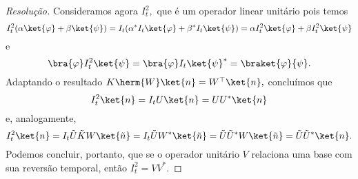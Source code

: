 \begin{proof}[Resolução]
    Consideramos agora \(I_t^2,\) que é um operador linear unitário pois temos
    \begin{equation*}
        I_t^2(\alpha \ket{\varphi} + \beta \ket{\psi}) = I_t (\alpha^* I_t\ket{\varphi} + \beta^* I_t \ket{\psi}) = \alpha I_t^2 \ket{\varphi} + \beta I_t^2 \ket{\psi}
    \end{equation*}
    e
    \begin{equation*}
        \bra{\varphi}I_t^2\ket{\psi} = \bra{\varphi}I_t\ket{\psi}^* = \braket{\varphi}{\psi}.
    \end{equation*}
    Adaptando o resultado \(K \herm{W} \ket{n} = W^\top \ket{n},\) concluímos que 
    \begin{equation*}
        I_t^2\ket{n} = I_t U\ket{n} = U U^* \ket{n}
    \end{equation*}
    e, analogamente,
    \begin{equation*}
        I_t^2\ket{n} = I_t \tilde{U} \tilde{K} W \ket{\tilde{n}} = I_t \tilde{U} W^* \ket{\tilde{n}} = \tilde{U} \tilde{U}^* W \ket{\tilde{n}} = \tilde{U} \tilde{U}^* \ket{n}.
    \end{equation*}
    Podemos concluir, portanto, que se o operador unitário \(V\) relaciona uma base com sua reversão temporal, então \(I_t^2 = VV^*.\)
\end{proof}
